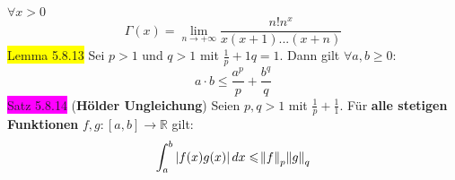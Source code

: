 \documentclass[landscape, 10pt]{article}
\newcommand{\R}{\mathbb{R}}
\begin{document}
\begin{multicols}{3}
                            \textcolor{NavyBlue}{
                            $\forall x>0$}
                            \begin{equation*}
                                   \Gamma(x)
                                   =\lim\limits_{n\to+\infty}
                                   \frac{n!n^x}{x(x+1)...(x+n)}
                            \end{equation*}
              \colorbox{yellow}{Lemma 5.8.13}
                     Sei \textcolor{NavyBlue}{$p>1$} und 
                     \textcolor{NavyBlue}{$q>1$} mit 
                     \textcolor{NavyBlue}{
                     $\frac{1}{p}+{1}{q}=1$}. Dann gilt 
                     \textcolor{NavyBlue}{
                     $\forall a,b\geqslant0$}:
                     \begin{equation*}
                            a\cdot b\leqslant
                            \frac{a^p}{p}+\frac{b^q}{q}
                     \end{equation*}
              \colorbox{magenta}{Satz 5.8.14} 
              (\textbf{Hölder Ungleichung}) 
                     Seien \textcolor{NavyBlue}{$p,q>1$} mit 
                     \textcolor{NavyBlue}{
                     $\frac{1}{p}+\frac{1}{1}$}. Für 
                     \textbf{alle stetigen Funktionen} 
                     \textcolor{NavyBlue}{
                     $f,g:[a,b]\longrightarrow\R$} gilt:
                     \begin{equation*}
                            \int_a^b|f(x)g(x)|\,dx
                            \leqslant\norm{f}_p\norm{g}_q
                     \end{equation*}
              \vfill\null\columnbreak

\end{multicols}
\end{document}
